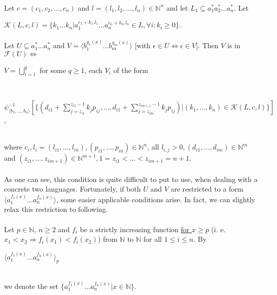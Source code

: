 \paragraph{}
\oznacenie Let $c = (c_{1}, c_{2}, ..., c_{n})$ and $l = (l_{1}, l_{2}, ..., l_{n}) \in \mathbb{N}^{n}$ and let $L_{1} \subseteq a_{1}^{*}a_{2}^{*}...a_{n}^{*}$. Let
\centerline{$\mathcal{K}(L, c, l) = \{ k_{1}...k_{n} | a_{1}^{c_{1}+k_{1}.l_{1}}...a_{n}^{c_{n}+k_{n}.l_{n}} \in L, \forall i: k_{i} \geq 0 \} $.}

\paragraph{}
\cveta Let $U \subseteq a_{1}^{*}...a_{n}^{*}$ and $V = \langle b_{1}^{g_{1}(x)}...b_{m}^{g_{m}(x)} \rangle $ [with $\epsilon \in U \Leftrightarrow \epsilon \in V$]. Then $V$ is in $\mathcal{F}(U) \Leftrightarrow $ \\
\centerline{$V = \bigcup_{i=1}^{q} $ for some $q \geq 1$, each $V_{i}$ of the form} \\
\centerline{$\psi_{\langle b_{1},...,b_{n}\rangle }^{-1} [ \{ ( d_{i1} + \sum_{j=z_{i1}}^{z_{i2} - 1} k_{j}p_{ij}, ..., d_{i1} + \sum_{j=z_{im}}^{z_{im+1} - 1} k_{j}p_{ij}) | (k_{1},...,k_{n}) \in \mathcal{K}(L, c, l) \} ]$, } \\
where $c_{i}, l_{i} = (l_{i1}, ..., l_{in}), (p_{i1},...,p_{in}) \in \mathbb{N}^{n}$, all $l_{i,j} > 0, (d_{i1}, ..., d_{im}) \in \mathbb{N}^{m}$ and $(z_{i1}, ..., z_{im+1}) \in \mathbb{N}^{m+1}, 1=z_{i1} < ... < z_{im+1} = n+1$.

\paragraph{}
As one can see, this condition is quite difficult to put to use, when dealing with a concrete two languages. Fortunately, if both $U$ and $V$ are restricted to a form $\langle a_{1}^{f_{1}(x)}...a_{n}^{f_{n}(x)} \rangle $, some easier applicable conditions arise. In fact, we can slightly relax this restriction to following.

\paragraph{}
\oznacenie Let $p \in \mathbb{N}$, $n \geq 2$ and $f_{i}$ be a strictly increasing function \underline{for $x \geq p$} (i. e. $x_{1} < x_{2} \Rightarrow f_{i}(x_{1}) < f_{i}(x_{2})$) from $\mathbb{N} $ to $\mathbb{N} $ for all $ 1 \leq i \leq n$. By \\
\centerline{$\langle a_{1}^{f_{1}(x)}...a_{n}^{f_{n}(x)} \rangle_{p} $} \\
we denote the set $\{ a_{1}^{f_{1}(x)}...a_{n}^{f_{n}(x)} | x \in \mathbb{N} \} $.

